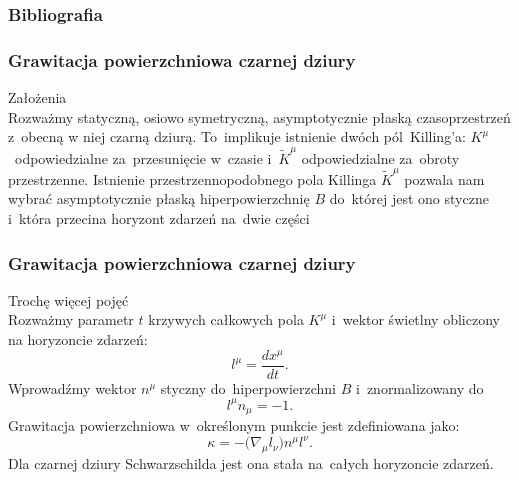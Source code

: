 \documentclass[10pt,t]{beamer}
\begin{document}










\begin{frame}
  \frametitle{Bibliografia}


  

  {}

\end{frame}





\begin{frame}
  \frametitle{Grawitacja powierzchniowa czarnej dziury}


  Założenia \\
  Rozważmy statyczną, osiowo symetryczną, asymptotycznie płaską
  czasoprzestrzeń z~obecną w niej czarną dziurą. To~implikuje
  istnienie dwóch pól~Killing'a: $K^{ \mu }$~odpowiedzialne
  za~przesunięcie w~czasie i~$\tilde{ K }^{ \mu }$ odpowiedzialne
  za~obroty przestrzenne. Istnienie przestrzennopodobnego pola
  Killinga $\tilde{ K }^{ \mu }$ pozwala nam wybrać asymptotycznie
  płaską hiperpowierzchnię $B$ do~której jest ono styczne i~która
  przecina horyzont zdarzeń na~dwie części

\end{frame}





\begin{frame}
  \frametitle{Grawitacja powierzchniowa czarnej dziury}


  Trochę więcej pojęć \\
  Rozważmy parametr $t$ krzywych całkowych pola $K^{ \mu }$ i~wektor
  świetlny obliczony na horyzoncie zdarzeń:
  \begin{equation}
    \label{eq:Promieniowanie-Hawkinga-31}
    l^{ \mu } =  \frac{ d x^{ \mu } }{ d t }.
  \end{equation}
  Wprowadźmy wektor $n^{ \mu }$ styczny do~hiperpowierzchni $B$
  i~znormalizowany do
  \begin{equation}
    \label{eq:Promieniowanie-Hawkinga-32}
    l^{ \mu } n_{ \mu } = -1.
  \end{equation}
  Grawitacja powierzchniowa w~określonym punkcie jest zdefiniowana
  jako:
  \begin{equation}
    \label{eq:Promieniowanie-Hawkinga-33}
    \kappa = - \big( \nabla_{ \mu } l_{ \nu } \big) n^{ \mu } l^{ \nu }.
  \end{equation}
  Dla czarnej dziury Schwarzschilda jest ona stała na~całych
  horyzoncie zdarzeń.

\end{frame}
\end{document}
